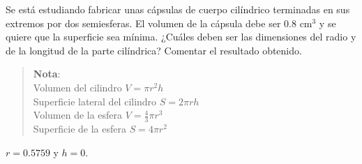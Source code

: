 {Se está estudiando fabricar unas cápsulas de cuerpo cilíndrico terminadas en sus extremos por dos semiesferas. El volumen de la cápsula debe ser $0.8$ cm$^3$ y se quiere que la superficie sea mínima. ¿Cuáles deben ser las dimensiones del radio y de la longitud de la parte cilíndrica? Comentar el resultado obtenido.
\begin{quote} 
    \textbf{Nota}:\\
    Volumen del cilindro $V=\pi r^2 h$\\
    Superficie lateral del cilindro $S=2\pi r h$\\
    Volumen de la esfera $V= \frac{4}{3}\pi r^3$\\
    Superficie de la esfera $S=4\pi r^2$\\
\end{quote}
}
{$r = 0.5759$ y $h=0$.
}
